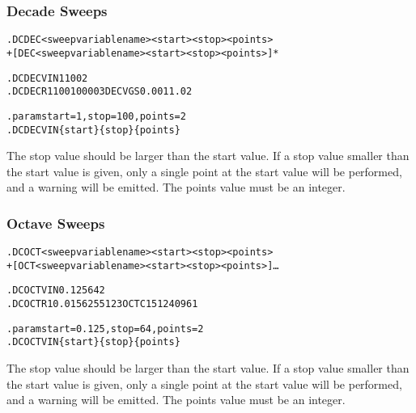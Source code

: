 \subsubsection{Decade Sweeps}
 

\begin{Command}
\format
\begin{alltt}
.DC DEC <sweep variable name> <start> <stop> <points>
+ [DEC <sweep variable name> <start> <stop> <points>]*
\end{alltt}

\examples
\begin{alltt}
.DC DEC VIN 1 100 2 
.DC DEC R1 100 10000 3 DEC VGS 0.001 1.0 2

.param start=1, stop=100, points=2
.DC DEC VIN \{start\} \{stop\} \{points\}
\end{alltt}

\comments
The stop value should be larger than the start value.  If a stop value
smaller than the start value is given, only a single point at the
start value will be performed, and a warning will be emitted.  The
points value must be an integer.

\end{Command}

\subsubsection{Octave Sweeps}
 

\begin{Command}
\format
\begin{alltt}
.DC OCT <sweep variable name> <start> <stop> <points>
+ [OCT <sweep variable name><start> <stop> <points>]\ldots 
\end{alltt}

\examples
\begin{alltt}
.DC OCT VIN 0.125 64 2 
.DC OCT R1 0.015625 512 3 OCT C1 512 4096 1

.param start=0.125, stop=64, points=2
.DC OCT VIN \{start\} \{stop\} \{points\}
\end{alltt}

\comments
The stop value should be larger than the start value.  If a stop value
smaller than the start value is given, only a single point at the
start value will be performed, and a warning will be emitted.  The
points value must be an integer.

\end{Command}

